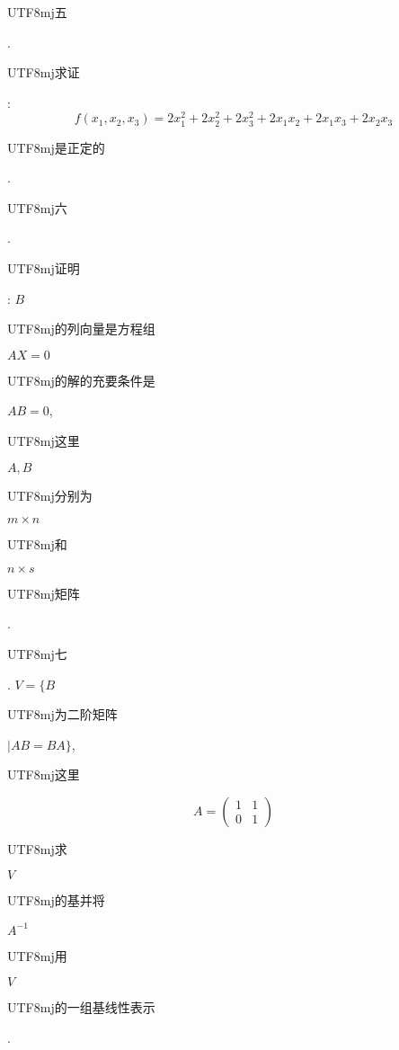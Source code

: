 \documentclass[10pt]{article}
\begin{document}
\begin{CJK}{UTF8}{mj}五\end{CJK}. \begin{CJK}{UTF8}{mj}求证\end{CJK}:
$$
f\left(x_{1}, x_{2}, x_{3}\right)=2 x_{1}^{2}+2 x_{2}^{2}+2 x_{3}^{2}+2 x_{1} x_{2}+2 x_{1} x_{3}+2 x_{2} x_{3}
$$
\begin{CJK}{UTF8}{mj}是正定的\end{CJK}.

\begin{CJK}{UTF8}{mj}六\end{CJK}. \begin{CJK}{UTF8}{mj}证明\end{CJK}: $B$ \begin{CJK}{UTF8}{mj}的列向量是方程组\end{CJK} $A X=0$ \begin{CJK}{UTF8}{mj}的解的充要条件是\end{CJK} $A B=0$, \begin{CJK}{UTF8}{mj}这里\end{CJK} $A, B$ \begin{CJK}{UTF8}{mj}分别为\end{CJK} $m \times n$ \begin{CJK}{UTF8}{mj}和\end{CJK} $n \times s$ \begin{CJK}{UTF8}{mj}矩阵\end{CJK}.

\begin{CJK}{UTF8}{mj}七\end{CJK}. $V=\{B$ \begin{CJK}{UTF8}{mj}为二阶矩阵\end{CJK} $\mid A B=B A\}$, \begin{CJK}{UTF8}{mj}这里\end{CJK}
$$
A=\left(\begin{array}{ll}
1 & 1 \\
0 & 1
\end{array}\right)
$$
\begin{CJK}{UTF8}{mj}求\end{CJK} $V$ \begin{CJK}{UTF8}{mj}的基并将\end{CJK} $A^{-1}$ \begin{CJK}{UTF8}{mj}用\end{CJK} $V$ \begin{CJK}{UTF8}{mj}的一组基线性表示\end{CJK}.
\end{document}
